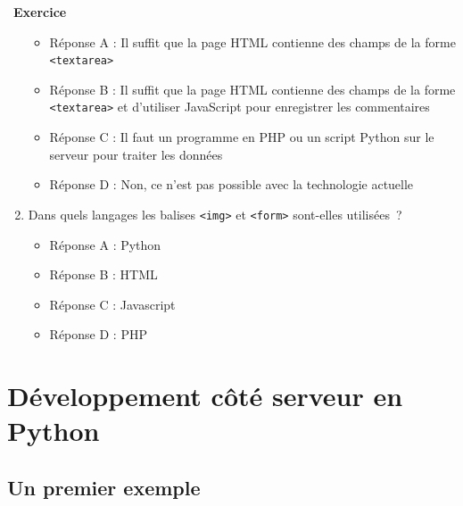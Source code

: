 \documentclass[
  11pt,
]{article}
\newcommand{\passthrough}[1]{#1}
\providecommand{\tightlist}{%
  \setlength{\itemsep}{0pt}\setlength{\parskip}{0pt}}
\newcounter{exo}
\newenvironment{exercice}[1]
{\par \medskip   \addtocounter{exo}{1} \noindent  
\begin{bclogo}[arrondi =0.1,   noborder = true, logo=\bccrayon, marge=4]{~\textbf{Exercice} \textbf{\theexo} {\itshape #1} }  \par}
{
\end{bclogo}
 \par \bigskip }
\newcounter{prog}
\newcounter{logi}
\begin{document}
\begin{exercice}{}
\begin{enumerate}
  \begin{itemize}
  \tightlist
  \item
    Réponse A : Il suffit que la page HTML contienne des champs de la
    forme \passthrough{\lstinline!<textarea>!}
  \item
    Réponse B : Il suffit que la page HTML contienne des champs de la
    forme \passthrough{\lstinline!<textarea>!} et d'utiliser JavaScript
    pour enregistrer les commentaires
  \item
    Réponse C : Il faut un programme en PHP ou un script Python sur le
    serveur pour traiter les données
  \item
    Réponse D : Non, ce n'est pas possible avec la technologie actuelle
  \end{itemize}
\item
  Dans quels langages les balises \passthrough{\lstinline!<img>!} et
  \passthrough{\lstinline!<form>!} sont-elles utilisées~?

  \begin{itemize}
  \tightlist
  \item
    Réponse A : Python
  \item
    Réponse B : HTML
  \item
    Réponse C : Javascript
  \item
    Réponse D : PHP
  \end{itemize}
\end{enumerate}

\end{exercice}

\hypertarget{duxe9veloppement-cuxf4tuxe9-serveur-en-python}{%
\section{Développement côté serveur en
Python}\label{duxe9veloppement-cuxf4tuxe9-serveur-en-python}}

\hypertarget{un-premier-exemple-1}{%
\subsection{Un premier exemple}\label{un-premier-exemple-1}}
\end{document}
